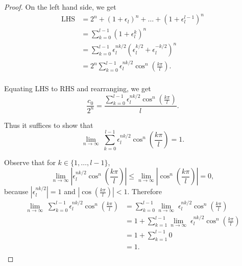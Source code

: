 \documentclass{article}
\begin{document}
\begin{enumerate}[label={\bf Q\arabic*:}]
\begin{proof}
      On the left hand side, we get
      \begin{align*}
        \text{LHS} &=2^n+(1+\epsilon_l)^n+\ldots+(1+\epsilon_l^{l-1})^n\\
        &=\sum_{k=0}^{l-1}(1+\epsilon_l^k)^n\\
        &=\sum_{k=0}^{l-1}
          \epsilon_l^{nk/2}(\epsilon_l^{k/2}+\epsilon_l^{-k/2})^n\\
        &=2^n\sum_{k=0}^{l-1}
          \epsilon_l^{nk/2}\cos^n\left(\frac{k\pi}{l}\right).\\
      \end{align*}

      Equating LHS to RHS and rearranging, we get
      \[\frac{c_0}{2^n}
      =\frac{\sum_{k=0}^{l-1}
      \epsilon_l^{nk/2}\cos^n\left(\frac{k\pi}{l}\right)}{l}.\]

      Thus it suffices to show that 
      \[\lim_{n\rightarrow\infty}\; \sum_{k=0}^{l-1}
      \epsilon_l^{nk/2}\cos^n\left(\frac{k\pi}{l}\right) =1.\]

      Observe that for $k\in\{1,\ldots,l-1\}$,
      \[\lim_{n\rightarrow\infty}
      \left|\epsilon_l^{nk/2} \cos^n\left(\frac{k\pi}{l}\right)\right|
      \leq\lim_{n\rightarrow\infty}
      \left|\cos^n\left(\frac{k\pi}{l}\right)\right|=0,\]
      because $|\epsilon_l^{nk/2}|=1$ and
      $\left|\cos\left(\frac{k\pi}{l}\right)\right|<1$. Therefore
      \begin{align*}
        \lim_{n\rightarrow\infty}\; \sum_{k=0}^{l-1}
          \epsilon_l^{nk/2}\cos^n\left(\frac{k\pi}{l}\right)
        &=\sum_{k=0}^{l-1} \lim_{n\rightarrow\infty}\;
          \epsilon_l^{nk/2}\cos^n\left(\frac{k\pi}{l}\right)\\
        &=1+\sum_{k=1}^{l-1} \lim_{n\rightarrow\infty}\;
          \epsilon_l^{nk/2}\cos^n\left(\frac{k\pi}{l}\right)\\
        &=1+\sum_{k=1}^{l-1}0\\
        &=1.\\
      \end{align*}
    \end{proof}
\end{enumerate}
\end{document}

